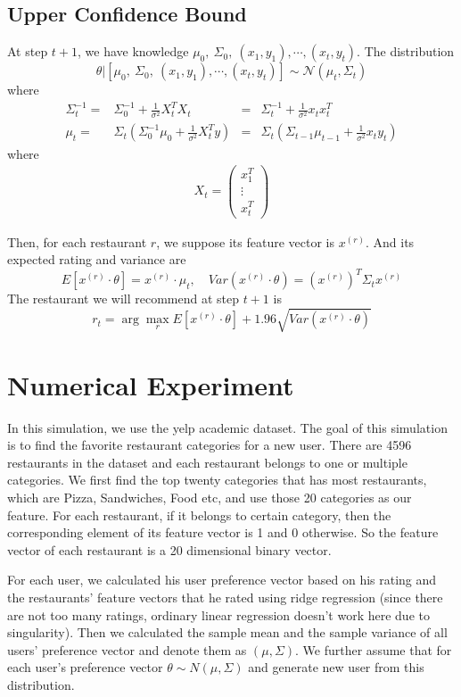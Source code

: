 \documentclass{article}
\begin{document}
\subsection{Upper Confidence Bound}
At step $t+1$, we have knowledge $\mu_0,\ \Sigma_0,\ ({x}_1, y_1), \cdots, ({x}_{t}, y_t)$. The distribution 
\[\theta | [ \mu_0,\ \Sigma_0,\ ({x}_1, y_1), \cdots, ({x}_{t}, y_t) ] \sim \mathcal{N}(\mu_{t}, \Sigma_{t}) \]
where 
\begin{align}
\Sigma_{t}^{-1} = & \Sigma_0^{-1}+\frac{1}{\sigma^2}X_t^TX_t &=& \Sigma_t^{-1} + \frac{1}{\sigma^2}{x}_t{x}_t^T\\
\mu_t = & \Sigma_t\left( \Sigma_0^{-1}\mu_0 + \frac{1}{\sigma^2}X_t^Ty \right) &= &\Sigma_t\left(\Sigma_{t-1}\mu_{t-1}+\frac{1}{\sigma^2}{x}_t y_t\right)
\end{align}
where 
\begin{align*}
X_t = \left(
\begin{array}{c}
{x}_1^T\\
\vdots\\
{x}_t^T
\end{array}\right)
\end{align*}

Then, for each restaurant $r$, we suppose its feature vector is ${x}^{(r)}$. And its expected rating and variance are
\[E[{x}^{(r)}\cdot \theta] = {x}^{(r)}\cdot \mu_t,\quad Var({x}^{(r)}\cdot \theta) =({x}^{(r)})^T\Sigma_t {x}^{(r)} \]
The restaurant we will recommend at step $t+1$ is
\[r_t = \arg\max_r E[{x}^{(r)}\cdot \theta] + 1.96 \sqrt{Var({x}^{(r)}\cdot \theta)}\]




\section{Numerical Experiment}
In this simulation, we use the yelp academic dataset. The goal of this simulation is to find the favorite restaurant categories for a new user. There are 4596 restaurants in the dataset and each restaurant belongs to one or multiple categories. We first find the top twenty categories that has most restaurants, which are Pizza, Sandwiches, Food etc, and use those 20 categories as our feature. For each restaurant, if it belongs to certain category, then the corresponding element of its feature vector is 1 and 0 otherwise. So the feature vector of each restaurant is a 20 dimensional binary vector. 

For each user, we calculated his user preference vector based on his rating and the restaurants' feature vectors that he rated using ridge regression (since there are not too many ratings, ordinary linear regression doesn't work here due to singularity). Then we calculated the sample mean and the sample variance of all users' preference vector and denote them as $(\mu,\Sigma)$. We further assume that for each user's preference vector $\theta\sim N(\mu,\Sigma)$ and generate new user from this distribution.
\end{document}
